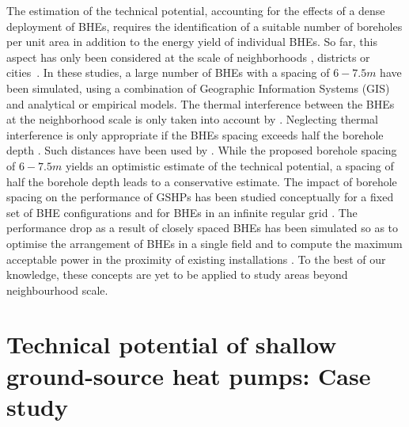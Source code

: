 The estimation of the technical potential, accounting for the effects of a dense deployment of BHEs, requires the identification of a suitable number of boreholes per unit area in addition to the energy yield of individual BHEs. 
So far, this aspect has only been considered at the scale of neighborhoods \cite{miglani_methodology_2018}, districts \cite{zhang_influence_2015} or cities~\cite{schiel_gis-based_2016}.
In these studies, a large number of BHEs with a spacing of $6-7.5m$ have been simulated, using a combination of Geographic Information Systems (GIS) and analytical or empirical models. 
The thermal interference between the BHEs at the neighborhood scale is only taken into account by \citet{miglani_methodology_2018}.
Neglecting thermal interference is only appropriate if the BHEs spacing exceeds half the borehole depth \cite{pahud_geothermal_2002}. 
Such distances have been used by \citet{stegnar_framework_2019, wagner_erdsondenpotenzial_2014}.
While the proposed borehole spacing of $6-7.5m$ yields an optimistic estimate of the technical potential, a spacing of half the borehole depth leads to a conservative estimate.
The impact of borehole spacing on the performance of GSHPs has been studied conceptually for a fixed set of BHE configurations \cite{signorelli_geoscientific_2004, vitriu_3d_2019} and for BHEs in an infinite regular grid \cite{rivera_increased_2017, fasci_analysis_2019}. 
The performance drop as a result of closely spaced BHEs has been simulated so as to optimise the arrangement of BHEs in a single field \cite{bayer_strategic_2014} and to compute the maximum acceptable power in the proximity of existing installations \cite{attard_novel_2020}. 
To the best of our knowledge, these concepts are yet to be applied to study areas beyond neighbourhood scale.

\section{Technical potential of shallow ground-source heat pumps: Case study}

